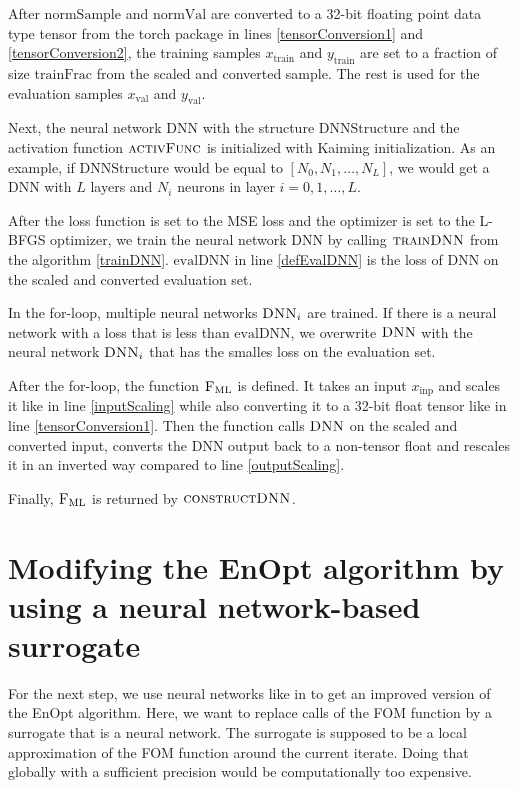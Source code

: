 After $\mathrm{normSample}$ and $\mathrm{normVal}$ are converted to a 32-bit floating point data type tensor from the torch package in lines \ref{tensorConversion1} and \ref{tensorConversion2}, the training samples $x_\mathrm{train}$ and $y_\mathrm{train}$ are set to a fraction of size $\mathrm{trainFrac}$ from the scaled and converted sample. The rest is used for the evaluation samples $x_\mathrm{val}$ and $y_\mathrm{val}$.

Next, the neural network $\mathrm{DNN}$ with the structure $\mathrm{DNNStructure}$ and the activation function $\textproc{activFunc}$ is initialized with Kaiming initialization. As an example, if $\mathrm{DNNStructure}$ would be equal to $[N_0, N_1, \dotsc, N_L]$, we would get a DNN with $L$ layers and $N_i$ neurons in layer $i=0, 1, \dotsc, L$.

After the loss function is set to the MSE loss and the optimizer is set to the L-BFGS optimizer, we train the neural network $\mathrm{DNN}$ by calling $\textproc{trainDNN}$ from the algorithm \ref{trainDNN}. $\mathrm{evalDNN}$ in line \ref{defEvalDNN} is the loss of $\mathrm{DNN}$ on the scaled and converted evaluation set.

In the for-loop, multiple neural networks $\textproc{DNN}_i$ are trained. If there is a neural network with a loss that is less than $\mathrm{evalDNN}$, we overwrite $\textproc{DNN}$ with the neural network $\textproc{DNN}_i$ that has the smalles loss on the evaluation set.

After the for-loop, the function $\textproc{F$_\mathrm{ML}$}$ is defined. It takes an input $x_\mathrm{inp}$ and scales it like in line \ref{inputScaling} while also converting it to a 32-bit float tensor like in line \ref{tensorConversion1}. Then the function calls $\textproc{DNN}$ on the scaled and converted input, converts the DNN output back to a non-tensor float and rescales it in an inverted way compared to line \ref{outputScaling}.

Finally, $\textproc{F$_\mathrm{ML}$}$ is returned by $\textproc{constructDNN}$.

\section{Modifying the EnOpt algorithm by using a neural network-based surrogate}
 For the next step, we use neural networks like in \cite{Keil2022-dj} to get an improved version of the EnOpt algorithm. Here, we want to replace calls of the FOM function by a surrogate that is a neural network. The surrogate is supposed to be a local approximation of the FOM function around the current iterate. Doing that globally with a sufficient precision would be computationally too expensive.
 
